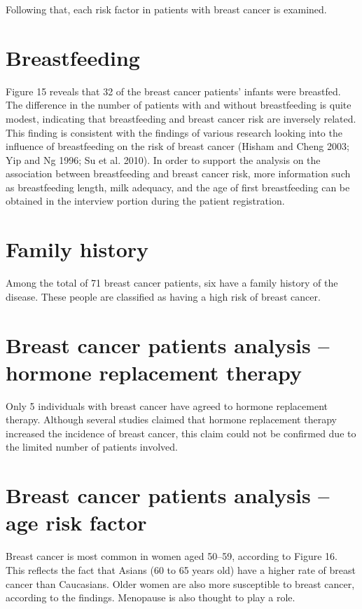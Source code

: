 \documentclass[10pt,a4paper,twoside]{article}
\begin{document}
Following that, each risk factor in patients with breast cancer is examined.

\section{Breastfeeding}

Figure 15 reveals that 32 of the breast cancer patients' infants were breastfed. The difference in the number of patients with and without breastfeeding is quite modest, indicating that breastfeeding and breast cancer risk are inversely related. This finding is consistent with the findings of various research looking into the influence of breastfeeding on the risk of breast cancer (Hisham and Cheng 2003; Yip and Ng 1996; Su et al. 2010). In order to support the analysis on the association between breastfeeding and breast cancer risk, more information such as breastfeeding length, milk adequacy, and the age of first breastfeeding can be obtained in the interview portion during the patient registration.



\section{Family history}

Among the total of 71 breast cancer patients, six have a family history of the disease. These people are classified as having a high risk of breast cancer.
\section{Breast cancer patients analysis – hormone replacement
therapy}
Only 5 individuals with breast cancer have agreed to hormone replacement therapy. Although several studies claimed that hormone replacement therapy increased the incidence of breast cancer, this claim could not be confirmed due to the limited number of patients involved.



\section{Breast cancer patients analysis – age risk factor}

Breast cancer is most common in women aged 50–59, according to Figure 16. This reflects the fact that Asians (60 to 65 years old) have a higher rate of breast cancer than Caucasians.
Older women are also more susceptible to breast cancer, according to the findings. Menopause is also thought to play a role.
\end{document}

